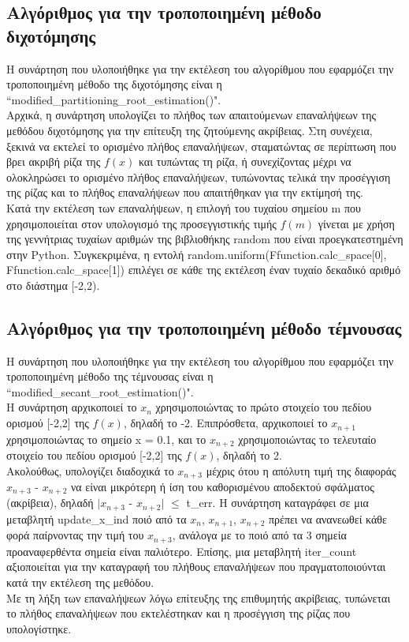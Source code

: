 \documentclass[a4paper,11pt]{article}
\newcommand{\lt}{\latintext}
\begin{document}
\subsection*{Αλγόριθμος για την τροποποιημένη μέθοδο διχοτόμησης}
Η συνάρτηση που υλοποιήθηκε για την εκτέλεση του αλγορίθμου που εφαρμόζει την τροποποιημένη μέθοδο της διχοτόμησης είναι η {\lt ``modified\_partitioning\_root\_estimation()"}. \\
Αρχικά, η συνάρτηση υπολογίζει το πλήθος των απαιτούμενων επαναλήψεων της μεθόδου διχοτόμησης για την επίτευξη της ζητούμενης ακρίβειας.  Στη συνέχεια, ξεκινά να εκτελεί το ορισμένο πλήθος επαναλήψεων, 				σταματώντας σε περίπτωση που βρει ακριβή ρίζα της {\lt$f(x)$} και τυπώντας τη ρίζα, ή συνεχίζοντας μέχρι να ολοκληρώσει το ορισμένο πλήθος επαναλήψεων, τυπώνοντας τελικά την προσέγγιση της ρίζας και το 				πλήθος επαναλήψεων που απαιτήθηκαν για την εκτίμησή της. \\
Κατά την εκτέλεση των επαναλήψεων, η επιλογή του τυχαίου σημείου {\lt m} που χρησιμοποιείται στον υπολογισμό της προσεγγιστικής τιμής {\lt $f(m)$} γίνεται με χρήση της γεννήτριας τυχαίων αριθμών της βιβλιοθήκης 
random που είναι προεγκατεστημένη στην Python. Συγκεκριμένα, η εντολή {\lt random.uniform(Ffunction.calc\_space[0], Ffunction.calc\_space[1])} επιλέγει σε κάθε της εκτέλεση έναν τυχαίο δεκαδικό αριθμό στο διάστημα [-2,2).
\subsection*{Αλγόριθμος για την τροποποιημένη μέθοδο τέμνουσας}
Η συνάρτηση που υλοποιήθηκε για την εκτέλεση του αλγορίθμου που εφαρμόζει την τροποποιημένη μέθοδο της τέμνουσας είναι η {\lt ``modified\_secant\_root\_estimation()"}. \\
Η συνάρτηση αρχικοποιεί το {$x_{n}$} χρησιμοποιώντας το πρώτο στοιχείο του πεδίου ορισμού [-2,2] της {\lt $f(x)$}, δηλαδή το -2. Επιπρόσθετα, αρχικοποιεί το {$x_{n+1}$} χρησιμοποιώντας το σημείο {\lt x = 0.1}, και το {$x_{n+2}$} χρησιμοποιώντας το τελευταίο στοιχείο του 	πεδίου ορισμού [-2,2] της {\lt $f(x)$}, δηλαδή το 2.\\
Ακολούθως, υπολογίζει διαδοχικά το {$x_{n+3}$} μέχρις ότου η απόλυτη τιμή της διαφοράς {$x_{n+3}$} - {$x_{n+2}$} να είναι μικρότερη ή ίση του καθορισμένου αποδεκτού σφάλματος (ακρίβεια), δηλαδή 
$|${$x_{n+3}$} - {$x_{n+2}$}$|$ {$\leq$} {\lt t\_err}. 
Η συνάρτηση καταγράφει σε μια μεταβλητή {update\_x\_ind} ποιό από τα {$x_{n}$}, {$x_{n+1}$}, {$x_{n+2}$} πρέπει να ανανεωθεί κάθε φορά παίρνοντας την τιμή του {$x_{n+3}$}, ανάλογα με το ποιό από τα 3 σημεία προαναφερθέντα σημεία είναι παλιότερο. Επίσης, μια μεταβλητή {\lt iter\_count} αξιοποιείται για την καταγραφή του πλήθους επαναλήψεων που πραγματοποιούνται κατά την εκτέλεση της μεθόδου.\\
Με τη λήξη των επαναλήψεων λόγω επίτευξης της επιθυμητής ακρίβειας, τυπώνεται το πλήθος επαναλήψεων που εκτελέστηκαν και η προσέγγιση της ρίζας που υπολογίστηκε. 
\end{document}
